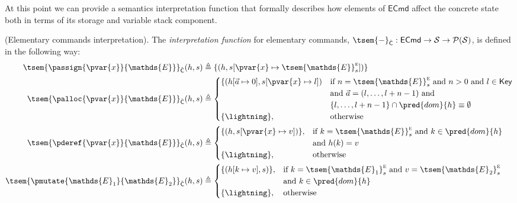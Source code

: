 At this point we can provide a semantics interpretation function that formally describes how elements of $\mathsf{ECmd}$ affect the concrete state both in terms of its storage and variable stack component.
\begin{defn}
	(Elementary commands interpretation).
	\label{ecmdint} The \emph{interpretation function} for elementary commands, $\tsem{-}_{\hat{\mathsf{C}}} : \mathsf{ECmd} \rightarrow \mathcal{S} \rightarrow \mathcal{P}(\mathcal{S})$, is defined in the following way:
	\begin{align*}
		\tsem{\passign{\pvar{x}}{\mathds{E}}}_{\hat{\mathsf{C}}}(h, s) &\triangleq \{ (h, s[\pvar{x} \mapsto \tsem{\mathds{E}}_s^\textsc{e}]) \}
		\\
		\tsem{\palloc{\pvar{x}}{\mathds{E}}}_{\hat{\mathsf{C}}}(h, s) &\triangleq
			\begin{cases}
				\{ (h[\vec{a} \mapsto 0], s[\pvar{x} \mapsto l])
				&
				\text{if } n = \tsem{\mathds{E}}_s^\textsc{e} \text{ and } n > 0 \text{ and } l \in \mathsf{Key}\\ & \text{and } \vec{a} = (l, \ldots, l + n - 1) \text{ and } \\
				& \{ l, \ldots, l + n - 1 \} \cap \pred{dom}{h} \equiv \emptyset \\
				\{ \lightning \}, & \text{otherwise}
			\end{cases}
		\\
		\tsem{\pderef{\pvar{x}}{\mathds{E}}}_{\hat{\mathsf{C}}}(h, s) &\triangleq
			\begin{cases}
				\{ (h, s[\pvar{x} \mapsto v]) \}, & \text{if } k = \tsem{\mathds{E}}_s^\textsc{e} \text{ and } k \in \pred{dom}{h} \\ & \text{and } h(k) = v \\
				\{ \lightning \}, & \text{otherwise}
			\end{cases}
		\\
		\tsem{\pmutate{\mathds{E}_1}{\mathds{E}_2}}_{\hat{\mathsf{C}}}(h, s) &\triangleq
		\begin{cases}
			\{ (h[k \mapsto v], s) \}, & \text{if } k = \tsem{\mathds{E}_1}_s^\textsc{e} \text{ and } v = \tsem{\mathds{E}_2}_s^\textsc{e} \\ & \text{and } k \in \pred{dom}{h} \\
			\{ \lightning \}, & \text{otherwise}
		\end{cases}
	\end{align*}
\end{defn}
